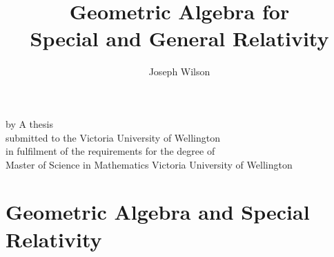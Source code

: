\newif\ifdebug
\newif\iffinal
\finaltrue


% 

\setlength{\parskip}{1em}

\title{Geometric Algebra for \\ Special and General Relativity}
\author{Joseph Wilson}

\makeatletter
\renewcommand\maketitle{
	\begin{center}
		\null\vfill
		{\huge\bfseries\sffamily \@title}
		\vfill
		by
		\vfill
		\@author
		\vfill
		A thesis \\
		submitted to the Victoria University of Wellington \\
		in fulfilment of the requirements for the degree of \\
		Master of Science in Mathematics
		\vfill
		Victoria University of Wellington \\
		\@date
		\vfill
	\end{center}
}
\makeatother




\frontmatter
{} %

	\maketitle
	\thispagestyle{empty}

	
	
	\tableofcontents

\restoregeometry %

\ifdebug
	
\fi

\mainmatter


\part{Geometric Algebra and Special Relativity}
\label{part:1}











